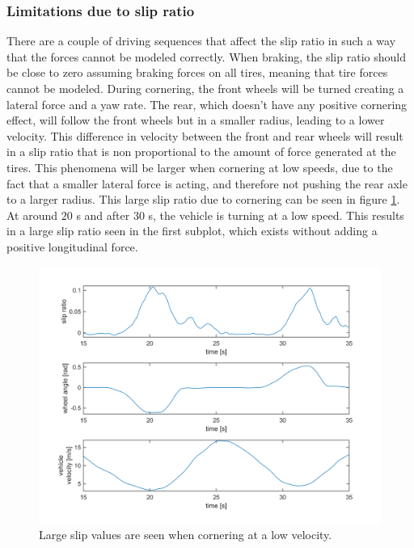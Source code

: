 \subsubsection{Limitations due to slip ratio }
There are a couple of driving sequences that affect the slip ratio in such a way that the forces cannot be modeled correctly. When braking, the slip ratio should be close to zero assuming braking forces on all tires, meaning that tire forces cannot be modeled. During cornering, the front wheels will be turned creating a lateral force and a yaw rate. The rear, which doesn't have any positive cornering effect, will follow the front wheels but in a smaller radius, leading to a lower velocity. This difference in velocity between the front and rear wheels will result in a slip ratio that is non proportional to the amount of force generated at the tires. This phenomena will be larger when cornering at low speeds, due to the fact that a smaller lateral force is acting, and therefore not pushing the rear axle to a larger radius. This large slip ratio due to cornering can be seen in figure \ref{turning_slow_Vx}. At around $ 20 $ s and after $ 30 $ s, the vehicle is turning at a low speed. This results in a large slip ratio seen in the first subplot, which exists without adding a positive longitudinal force.

\begin{figure}[h]
	\centering
	\includegraphics[width=1.0\textwidth]{Pictures/turning_slow_Vx}
	\caption {Large slip values are seen when cornering at a low velocity.}
	\label{turning_slow_Vx}
\end{figure}

